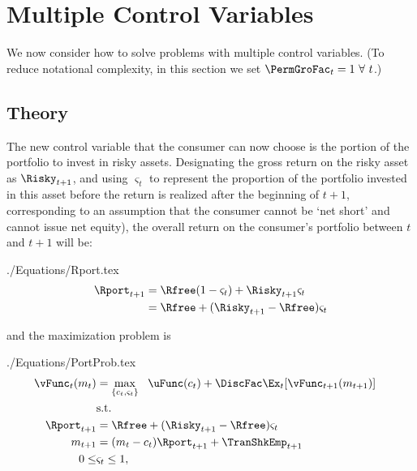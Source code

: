 \documentclass[titlepage, headings=optiontotocandhead]{\econtex}
\begin{document}
\hypertarget{Multiple-Control-Variables}{}
\section{Multiple Control Variables}

We now consider how to solve problems with multiple control variables.
(To reduce notational complexity, in this section we set $\PermGroFac_{t}=1~\forall~t$.)

\subsection{Theory}\label{subsec:MCTheory}
The new control variable that the consumer can now choose is the portion of the portfolio to invest in risky assets.  Designating the gross return on the risky asset as $\Risky_{t+1}$, and using $\varsigma_{t}$ to represent the proportion of the portfolio invested in this asset before the return is realized after the beginning of $t+1$, corresponding to an assumption that the consumer cannot be `net short' and cannot issue net equity), the overall return on the consumer's portfolio between $t$ and $t+1$ will be:
\begin{verbatimwrite}{./Equations/Rport.tex}
  \begin{equation}\begin{gathered}\begin{aligned}
        \Rport_{t+1}  & = \Rfree(1-\varsigma_{t}) + \Risky_{t+1}\varsigma_{t} \label{eq:return1}
        \\               & = \Rfree + (\Risky_{t+1}-\Rfree) \varsigma_{t} %
      \end{aligned}\end{gathered}\end{equation}
\end{verbatimwrite}
\unskip
and the maximization problem is
\begin{verbatimwrite}{./Equations/PortProb.tex}
  \begin{equation*}\begin{gathered}\begin{aligned}
        {\vFunc}_{t}({m}_{t})  & = \max_{\{{c}_{t},\varsigma_{t}\}}   ~~ \uFunc({c}_{t}) +  \DiscFac
        \Ex_{t}[{\vFunc}_{t+1}({m}_{t+1})]
        \\      & \text{s.t.} & \nonumber
        \\      \Rport_{t+1}  & = \Rfree + (\Risky_{t+1}-\Rfree) \varsigma_{t}
        \\      {m}_{t+1}  & = ({m}_{t}-{c}_{t})\Rport_{t+1} + \TranShkEmp_{t+1}
        \\  0       \leq & \varsigma_{t}  \leq 1, \label{eq:noshorts}
      \end{aligned}\end{gathered}\end{equation*}
\end{verbatimwrite}
\end{document}
